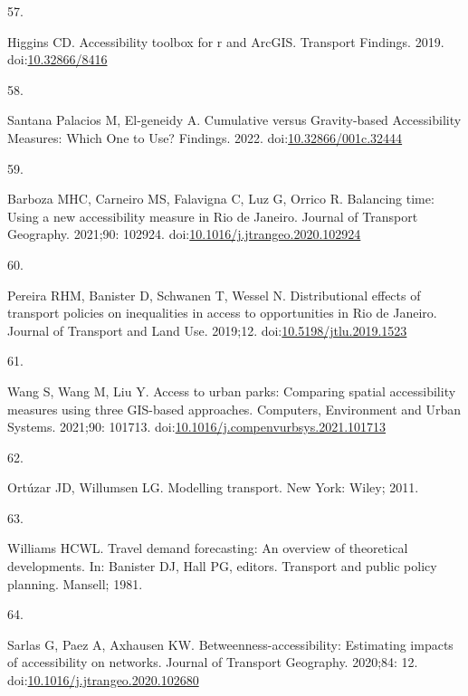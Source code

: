 \documentclass[10pt,letterpaper]{article}
\newlength{\cslhangindent}
\newlength{\csllabelwidth}
\newlength{\cslentryspacingunit} %
\newenvironment{CSLReferences}[2] %
 {%
  \setlength{\parindent}{0pt}
  \ifodd #1
  \let\oldpar\par
  \def\par{\hangindent=\cslhangindent\oldpar}
  \fi
  \setlength{\parskip}{#2\cslentryspacingunit}
 }%
 {}
\newcommand{\CSLLeftMargin}[1]{\parbox[t]{\csllabelwidth}{#1}}
\newcommand{\CSLRightInline}[1]{\parbox[t]{\linewidth - \csllabelwidth}{#1}\break}
\begin{document}
\begin{CSLReferences}{0}{0}
\leavevmode{}%
\CSLLeftMargin{57. }%
\CSLRightInline{Higgins CD. Accessibility toolbox for r and ArcGIS.
Transport Findings. 2019.
doi:\href{https://doi.org/10.32866/8416}{10.32866/8416}}

\leavevmode{}%
\CSLLeftMargin{58. }%
\CSLRightInline{Santana Palacios M, El-geneidy A. Cumulative versus
Gravity-based Accessibility Measures: Which One to Use? Findings. 2022.
doi:\href{https://doi.org/10.32866/001c.32444}{10.32866/001c.32444}}

\leavevmode{}%
\CSLLeftMargin{59. }%
\CSLRightInline{Barboza MHC, Carneiro MS, Falavigna C, Luz G, Orrico R.
Balancing time: {Using} a new accessibility measure in {Rio} de
{Janeiro}. Journal of Transport Geography. 2021;90: 102924.
doi:\href{https://doi.org/10.1016/j.jtrangeo.2020.102924}{10.1016/j.jtrangeo.2020.102924}}

\leavevmode{}%
\CSLLeftMargin{60. }%
\CSLRightInline{Pereira RHM, Banister D, Schwanen T, Wessel N.
Distributional effects of transport policies on inequalities in access
to opportunities in {Rio} de {Janeiro}. Journal of Transport and Land
Use. 2019;12.
doi:\href{https://doi.org/10.5198/jtlu.2019.1523}{10.5198/jtlu.2019.1523}}

\leavevmode{}%
\CSLLeftMargin{61. }%
\CSLRightInline{Wang S, Wang M, Liu Y. Access to urban parks:
{Comparing} spatial accessibility measures using three {GIS}-based
approaches. Computers, Environment and Urban Systems. 2021;90: 101713.
doi:\href{https://doi.org/10.1016/j.compenvurbsys.2021.101713}{10.1016/j.compenvurbsys.2021.101713}}

\leavevmode{}%
\CSLLeftMargin{62. }%
\CSLRightInline{Ortúzar JD, Willumsen LG. Modelling transport. New York:
Wiley; 2011. }

\leavevmode{}%
\CSLLeftMargin{63. }%
\CSLRightInline{Williams HCWL. Travel demand forecasting: An overview of
theoretical developments. In: Banister DJ, Hall PG, editors. Transport
and public policy planning. Mansell; 1981. }

\leavevmode{}%
\CSLLeftMargin{64. }%
\CSLRightInline{Sarlas G, Paez A, Axhausen KW.
Betweenness-accessibility: Estimating impacts of accessibility on
networks. Journal of Transport Geography. 2020;84: 12.
doi:\href{https://doi.org/10.1016/j.jtrangeo.2020.102680}{10.1016/j.jtrangeo.2020.102680}}


\end{CSLReferences}
\end{document}
